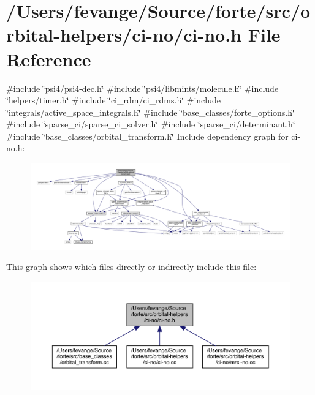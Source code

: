 \hypertarget{ci-no_8h}{}\section{/\+Users/fevange/\+Source/forte/src/orbital-\/helpers/ci-\/no/ci-\/no.h File Reference}
\label{ci-no_8h}
{\ttfamily \#include \char`\"{}psi4/psi4-\/dec.\+h\char`\"{}}\newline
{\ttfamily \#include \char`\"{}psi4/libmints/molecule.\+h\char`\"{}}\newline
{\ttfamily \#include \char`\"{}helpers/timer.\+h\char`\"{}}\newline
{\ttfamily \#include \char`\"{}ci\+\_\+rdm/ci\+\_\+rdms.\+h\char`\"{}}\newline
{\ttfamily \#include \char`\"{}integrals/active\+\_\+space\+\_\+integrals.\+h\char`\"{}}\newline
{\ttfamily \#include \char`\"{}base\+\_\+classes/forte\+\_\+options.\+h\char`\"{}}\newline
{\ttfamily \#include \char`\"{}sparse\+\_\+ci/sparse\+\_\+ci\+\_\+solver.\+h\char`\"{}}\newline
{\ttfamily \#include \char`\"{}sparse\+\_\+ci/determinant.\+h\char`\"{}}\newline
{\ttfamily \#include \char`\"{}base\+\_\+classes/orbital\+\_\+transform.\+h\char`\"{}}\newline
Include dependency graph for ci-\/no.h\+:
\nopagebreak
\begin{figure}[H]
\begin{center}
\leavevmode
\includegraphics[width=350pt]{ci-no_8h__incl}
\end{center}
\end{figure}
This graph shows which files directly or indirectly include this file\+:
\nopagebreak
\begin{figure}[H]
\begin{center}
\leavevmode
\includegraphics[width=350pt]{ci-no_8h__dep__incl}
\end{center}
\end{figure}
